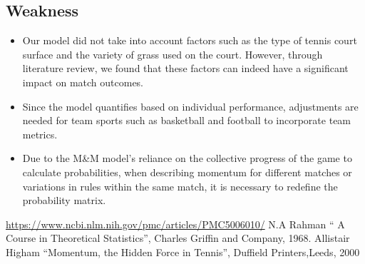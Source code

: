 \documentclass{mcmthesis}
\begin{document}
\subsection{Weakness}
\begin{itemize}
	\item Our model did not take into account factors such as the type of tennis court surface and the variety of grass used on the court. However, through literature review, we found that these factors can indeed have a significant impact on match outcomes.
	\item Since the model quantifies based on individual performance, adjustments are needed for team sports such as basketball and football to incorporate team metrics.
	\item Due to the M\&M model's reliance on the collective progress of the game to calculate probabilities, when describing momentum for different matches or variations in rules within the same match, it is necessary to redefine the probability matrix.
\end{itemize}


\begin{thebibliography}{99}
 \url{https://www.ncbi.nlm.nih.gov/pmc/articles/PMC5006010/}
 N.A Rahman `` A Course in Theoretical Statistics'',
Charles Griffin and Company, 1968.
 Allistair Higham ``Momentum, the Hidden Force in Tennis'',
Duffield Printers,Leeds, 2000
\end{thebibliography}
\end{document}
